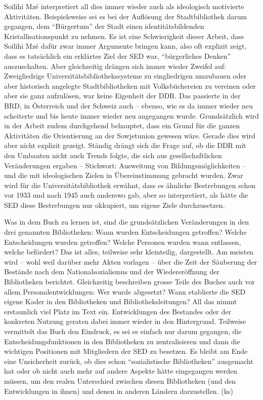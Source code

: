 \documentclass[a4paper,
fontsize=11pt,
oneside,
numbers=noperiodatend,
parskip=half-,
bibliography=totoc,
final
]{scrartcl}
\begin{document}
Soilihi Mzé interpretiert all dies immer wieder auch als ideologisch
motivierte Aktivitäten. Beispielsweise sei es bei der Auflösung der
Stadtbibliothek darum gegangen, dem \enquote{Bürgertum} der Stadt einen
identitätsbildenden Kristallisationspunkt zu nehmen. Es ist eine
Schwierigkeit dieser Arbeit, dass Soilihi Mzé dafür zwar immer Argumente
bringen kann, also oft explizit zeigt, dass es tatsächlich ein erklärtes
Ziel der SED war, \enquote{bürgerliches Denken} auszuschalten. Aber
gleichzeitig drängen sich immer wieder Zweifel auf: Zweigliedrige
Universitätsbibliothekssysteme zu eingliedrigen umzubauen oder aber
historisch angelegte Stadtbibliotheken mit Volksbüchereien zu vereinen
oder aber sie ganz aufzulösen, war keine Eigenheit der DDR. Das
passierte in der BRD, in Österreich und der Schweiz auch -- ebenso, wie
es da immer wieder neu scheiterte und bis heute immer wieder neu
angegangen wurde. Grundsätzlich wird in der Arbeit zudem durchgehend
behauptet, dass ein Grund für die ganzen Aktivitäten die Orientierung an
der Sowjetunion gewesen wäre. Gerade dies wird aber nicht explizit
gezeigt. Ständig drängt sich die Frage auf, ob die DDR mit den Umbauten
nicht auch Trends folgte, die sich aus gesellschaftlichen Veränderungen
ergaben -- Stichwort: Ausweitung von Bildungsmöglichkeiten -- und die
mit ideologischen Zielen in Übereinstimmung gebracht wurden. Zwar wird
für die Universitätsbibliothek erwähnt, dass es ähnliche Bestrebungen
schon vor 1933 und nach 1945 auch anderswo gab, aber so interpretiert,
als hätte die SED diese Bestrebungen nur okkupiert, um eigene Ziele
durchzusetzen.

Was in dem Buch zu lernen ist, sind die grundsätzlichen Veränderungen in
den drei genannten Bibliotheken: Wann wurden Entscheidungen getroffen?
Welche Entscheidungen wurden getroffen? Welche Personen wurden wann
entlassen, welche befördert? Das ist alles, teilweise sehr kleinteilig,
dargestellt. Am meisten wird -- wohl weil darüber mehr Akten vorlagen --
über die Zeit der Säuberung der Bestände nach dem Nationalsozialismus
und der Wiedereröffnung der Bibliotheken berichtet. Gleichzeitig
beschreiben grosse Teile des Buches auch vor allem
Personalentwicklungen: Wer wurde abgesetzt? Wann etablierte die SED
eigene Kader in den Bibliotheken und Bibliotheksleitungen? All das nimmt
erstaunlich viel Platz im Text ein. Entwicklungen des Bestandes oder der
konkreten Nutzung geraten dabei immer wieder in den Hintergrund.
Teilweise vermittelt das Buch den Eindruck, es sei es einfach nur darum
gegangen, die Entscheidungsfunktionen in den Bibliotheken zu
zentralisieren und dann die wichtigen Positionen mit Mitgliedern der SED
zu besetzen. Es bleibt am Ende eine Unsicherheit zurück, ob dies schon
\enquote{sozialistische Bibliotheken} ausgemacht hat oder ob nicht auch
mehr auf andere Aspekte hätte eingegangen werden müssen, um den realen
Unterschied zwischen diesen Bibliotheken (und den Entwicklungen in
ihnen) und denen in anderen Ländern darzustellen. (ks)
\end{document}

